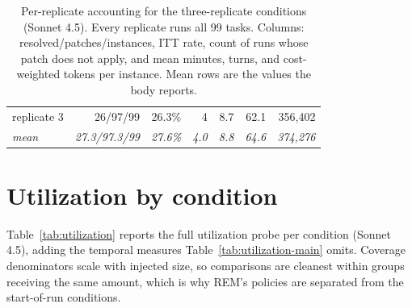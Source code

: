 \documentclass{article}
\newcommand{\sysname}{REM}
\begin{document}
\begin{table}[h]
\begin{center}
{\begin{tabular}{@{}lrrrrrr@{}}
\quad replicate 3 & 26/97/99 & 26.3\% & 4 & 8.7 & 62.1 & 356,402 \\
\quad \textit{mean} & \textit{27.3/97.3/99} & \textit{27.6\%} & \textit{4.0} & \textit{8.8} & \textit{64.6} & \textit{374,276} \\
\bottomrule
\end{tabular}}
\end{center}
\caption{Per-replicate accounting for the three-replicate conditions (Sonnet 4.5). Every replicate runs all 99 tasks. Columns: resolved/patches/instances, ITT rate, count of runs whose patch does not apply, and mean minutes, turns, and cost-weighted tokens per instance. Mean rows are the values the body reports.}
\label{tab:rep-summary}
\end{table}

\section{Utilization by condition}
\label{app:utilization}

Table~\ref{tab:utilization} reports the full utilization probe per condition (Sonnet 4.5), adding the temporal measures Table~\ref{tab:utilization-main} omits. Coverage denominators scale with injected size, so comparisons are cleanest within groups receiving the same amount, which is why \sysname{}'s policies are separated from the start-of-run conditions.
\end{document}
